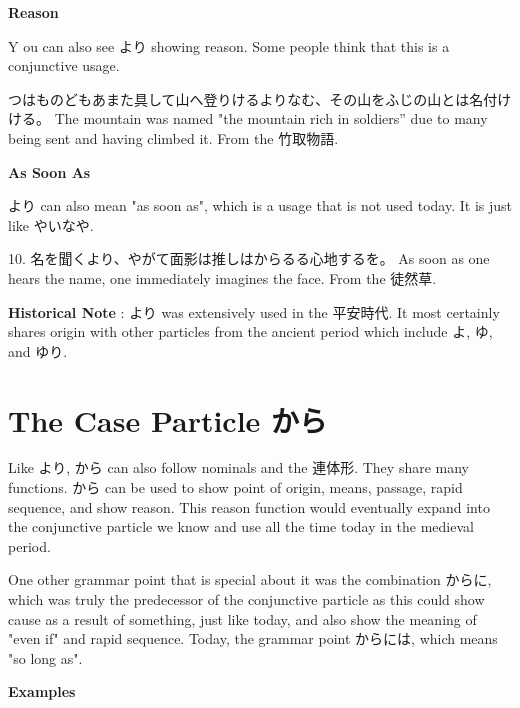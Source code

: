 \begin{center}
\textbf{Reason }
\end{center}

\par{ Y ou can also see より showing reason. Some people think that this is a conjunctive usage. }

\par{つはものどもあまた具して山へ登りけるよりなむ、その山をふじの山とは名付けける。 \hfill\break
The mountain was named "the mountain rich in soldiers” due to many being sent and having climbed it. \hfill\break
From the 竹取物語. }

\begin{center}
 \textbf{As Soon As }
\end{center}

\par{ より can also mean "as soon as", which is a usage that is not used today. It is just like やいなや. }

\par{10. 名を聞くより、やがて面影は推しはからるる心地するを。 \hfill\break
As soon as one hears the name, one immediately imagines the face. \hfill\break
From the 徒然草. }

\par{\textbf{Historical Note }: より was extensively used in the 平安時代. It most certainly shares origin with other particles from the ancient period which include よ, ゆ, and ゆり. }
      
\section{The Case Particle から}
 
\par{ Like より, から can also follow nominals and the 連体形. They share many functions. から can be used to show point of origin, means, passage, rapid sequence, and show reason. This reason function would eventually expand into the conjunctive particle we know and use all the time today in the medieval period. }

\par{ One other grammar point that is special about it was the combination からに, which was truly the predecessor of the conjunctive particle as this could show cause as a result of something, just like today, and also show the meaning of "even if" and rapid sequence. Today, the grammar point からには, which means "so long as". }

\begin{center}
 \textbf{Examples }
\end{center}

